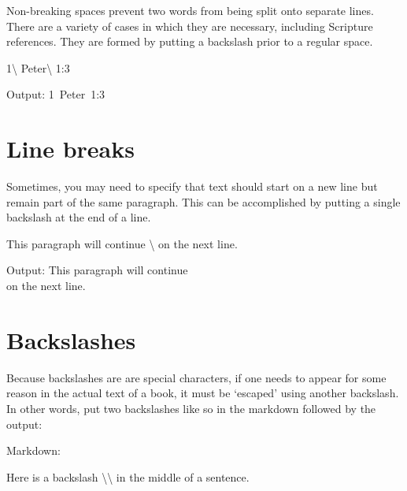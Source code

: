 \documentclass[
  english,
]{book}
\newenvironment{Shaded}{\begin{snugshade}}{\end{snugshade}}
\newcommand{\NormalTok}[1]{#1}
\newcommand{\SpecialCharTok}[1]{\textcolor[rgb]{0.00,0.00,0.00}{#1}}
\begin{document}
Non-breaking spaces prevent two words from being split onto separate lines. There are a variety of cases in which they are necessary, including Scripture references. They are formed by putting a backslash prior to a regular space.

\begin{Shaded}
\begin{Highlighting}[]
\NormalTok{1\textbackslash{} Peter\textbackslash{} 1:3 }
\end{Highlighting}
\end{Shaded}

Output: 1~Peter~1:3

\hypertarget{line-breaks}{%
\section{Line breaks}\label{line-breaks}}

Sometimes, you may need to specify that text should start on a new line but remain part of the same paragraph. This can be accomplished by putting a single backslash at the end of a line.

\begin{Shaded}
\begin{Highlighting}[]
\NormalTok{This paragraph will continue \textbackslash{}}
\NormalTok{on the next line.}
\end{Highlighting}
\end{Shaded}

Output: This paragraph will continue\\
on the next line.

\hypertarget{backslashes}{%
\section{Backslashes}\label{backslashes}}

Because backslashes are are special characters, if one needs to appear for some reason in the actual text of a book, it must be `escaped' using another backslash. In other words, put two backslashes like so in the markdown followed by the output:

Markdown:

\begin{Shaded}
\begin{Highlighting}[]
\NormalTok{Here is a backslash }\SpecialCharTok{\textbackslash{}\textbackslash{}}\NormalTok{ in the middle of a sentence. }
\end{Highlighting}
\end{Shaded}
\end{document}
